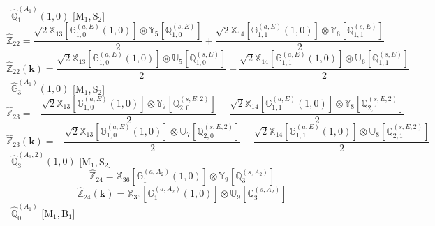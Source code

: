 \documentclass[fleqn,10pt,landscape]{article}
\begin{document}
\begin{itemize}
\begin{dmath*}
\end{dmath*}
\vspace{4mm}
\noindent {} $\,\,\,\hat{\mathbb{Q}}_{1}^{(A_{1})}(1,0)$ [M$_{1}$,\,S$_{2}$]
\begin{dmath*}
\hat{\mathbb{Z}}_{22}=\frac{\sqrt{2} \mathbb{X}_{13}[\mathbb{G}_{1,0}^{(a,E)}(1,0)] \otimes\mathbb{Y}_{5}[\mathbb{Q}_{1,0}^{(s,E)}]}{2} + \frac{\sqrt{2} \mathbb{X}_{14}[\mathbb{G}_{1,1}^{(a,E)}(1,0)] \otimes\mathbb{Y}_{6}[\mathbb{Q}_{1,1}^{(s,E)}]}{2}
\end{dmath*}
\begin{dmath*}
\hat{\mathbb{Z}}_{22}(\bm{k})=\frac{\sqrt{2} \mathbb{X}_{13}[\mathbb{G}_{1,0}^{(a,E)}(1,0)] \otimes\mathbb{U}_{5}[\mathbb{Q}_{1,0}^{(s,E)}]}{2} + \frac{\sqrt{2} \mathbb{X}_{14}[\mathbb{G}_{1,1}^{(a,E)}(1,0)] \otimes\mathbb{U}_{6}[\mathbb{Q}_{1,1}^{(s,E)}]}{2}
\end{dmath*}
\vspace{4mm}
\noindent {} $\,\,\,\hat{\mathbb{G}}_{3}^{(A_{1})}(1,0)$ [M$_{1}$,\,S$_{2}$]
\begin{dmath*}
\hat{\mathbb{Z}}_{23}=- \frac{\sqrt{2} \mathbb{X}_{13}[\mathbb{G}_{1,0}^{(a,E)}(1,0)] \otimes\mathbb{Y}_{7}[\mathbb{Q}_{2,0}^{(s,E,2)}]}{2} - \frac{\sqrt{2} \mathbb{X}_{14}[\mathbb{G}_{1,1}^{(a,E)}(1,0)] \otimes\mathbb{Y}_{8}[\mathbb{Q}_{2,1}^{(s,E,2)}]}{2}
\end{dmath*}
\begin{dmath*}
\hat{\mathbb{Z}}_{23}(\bm{k})=- \frac{\sqrt{2} \mathbb{X}_{13}[\mathbb{G}_{1,0}^{(a,E)}(1,0)] \otimes\mathbb{U}_{7}[\mathbb{Q}_{2,0}^{(s,E,2)}]}{2} - \frac{\sqrt{2} \mathbb{X}_{14}[\mathbb{G}_{1,1}^{(a,E)}(1,0)] \otimes\mathbb{U}_{8}[\mathbb{Q}_{2,1}^{(s,E,2)}]}{2}
\end{dmath*}
\vspace{4mm}
\noindent {} $\,\,\,\hat{\mathbb{Q}}_{3}^{(A_{1},2)}(1,0)$ [M$_{1}$,\,S$_{2}$]
\begin{dmath*}
\hat{\mathbb{Z}}_{24}=\mathbb{X}_{36}[\mathbb{G}_{1}^{(a,A_{2})}(1,0)] \otimes\mathbb{Y}_{9}[\mathbb{Q}_{3}^{(s,A_{2})}]
\end{dmath*}
\begin{dmath*}
\hat{\mathbb{Z}}_{24}(\bm{k})=\mathbb{X}_{36}[\mathbb{G}_{1}^{(a,A_{2})}(1,0)] \otimes\mathbb{U}_{9}[\mathbb{Q}_{3}^{(s,A_{2})}]
\end{dmath*}
\vspace{4mm}
\noindent {} $\,\,\,\hat{\mathbb{Q}}_{0}^{(A_{1})}$ [M$_{1}$,\,B$_{1}$]
\begin{dmath*}

\end{dmath*}
\end{itemize}
\end{document}
